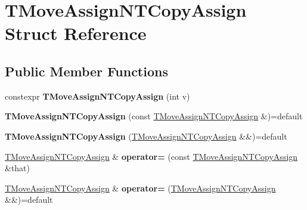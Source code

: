\hypertarget{struct_t_move_assign_n_t_copy_assign}{}\section{T\+Move\+Assign\+N\+T\+Copy\+Assign Struct Reference}
\label{struct_t_move_assign_n_t_copy_assign}
\subsection*{Public Member Functions}
\begin{DoxyCompactItemize}
\item 
\mbox{\label{struct_t_move_assign_n_t_copy_assign_ad76ac9ce53fa43ce256e056d92f6f094}} 
constexpr {\bfseries T\+Move\+Assign\+N\+T\+Copy\+Assign} (int v)
\item 
\mbox{\label{struct_t_move_assign_n_t_copy_assign_acd073d4aefbe8d897f8740ff2ad0462e}} 
{\bfseries T\+Move\+Assign\+N\+T\+Copy\+Assign} (const \mbox{\hyperlink{struct_t_move_assign_n_t_copy_assign}{T\+Move\+Assign\+N\+T\+Copy\+Assign}} \&)=default
\item 
\mbox{\label{struct_t_move_assign_n_t_copy_assign_a20638b75b3f5499a22ded6446a220ecc}} 
{\bfseries T\+Move\+Assign\+N\+T\+Copy\+Assign} (\mbox{\hyperlink{struct_t_move_assign_n_t_copy_assign}{T\+Move\+Assign\+N\+T\+Copy\+Assign}} \&\&)=default
\item 
\mbox{\label{struct_t_move_assign_n_t_copy_assign_ae10ca39ae3d49759c9fa660ccd363e4b}} 
\mbox{\hyperlink{struct_t_move_assign_n_t_copy_assign}{T\+Move\+Assign\+N\+T\+Copy\+Assign}} \& {\bfseries operator=} (const \mbox{\hyperlink{struct_t_move_assign_n_t_copy_assign}{T\+Move\+Assign\+N\+T\+Copy\+Assign}} \&that)
\item 
\mbox{\label{struct_t_move_assign_n_t_copy_assign_af70eb28fd342e9acaa301875a8e99c95}} 
\mbox{\hyperlink{struct_t_move_assign_n_t_copy_assign}{T\+Move\+Assign\+N\+T\+Copy\+Assign}} \& {\bfseries operator=} (\mbox{\hyperlink{struct_t_move_assign_n_t_copy_assign}{T\+Move\+Assign\+N\+T\+Copy\+Assign}} \&\&)=default
\end{DoxyCompactItemize}
